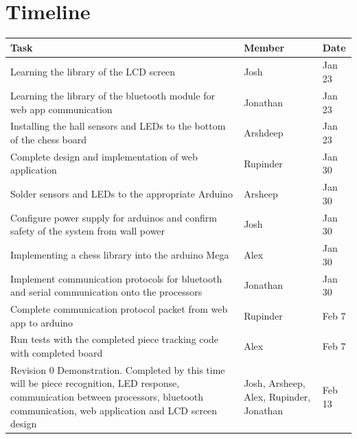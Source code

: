 \documentclass[12pt, titlepage]{article}
\begin{document}
\section{Timeline}
\begin{table}[H]
  \centering
      \setlength{\leftmargini}{0.4cm}
      \begin{tabular}{| >{\centering\arraybackslash}m{10cm} | 
        >{\centering\arraybackslash}m{2cm} | 
        >{\centering\arraybackslash}m{1.5cm} |}
      \hline
      \rowcolor[gray]{0.9}
      Task & Member & Date\\
      \hline 
      Learning the library of the LCD screen & Josh & Jan 23\\
      \hline
      Learning the library of the bluetooth module for web app communication & Jonathan & Jan 23\\
      \hline 
      Installing the hall sensors and LEDs to the bottom of the chess board & Arshdeep & Jan 23\\
      \hline
      Complete design and implementation of web application & Rupinder & Jan 30\\
      \hline 
      Solder sensors and LEDs to the appropriate Arduino & Arsheep & Jan 30\\
      \hline 
      Configure power supply for arduinos and confirm safety of the system from wall power & Josh & Jan 30\\
      \hline
      Implementing a chess library into the arduino Mega & Alex & Jan 30\\
      \hline 
      Implement communication protocols for bluetooth and serial communication onto the processors & Jonathan
      & Jan 30\\
      \hline 
      Complete communication protocol packet from web app to arduino & Rupinder & Feb 7\\
      \hline 
      Run tests with the completed piece tracking code with completed board & Alex & Feb 7\\
      \hline 
      Revision 0 Demonstration. Completed by this time will be piece recognition, LED response, communication 
      between processors, bluetooth communication, web application and LCD screen design
      & Josh, Arsheep, Alex, Rupinder, Jonathan & Feb 13\\
      \hline
      
      \end{tabular}
  \label{Table}
  \end{table}
\end{document}
